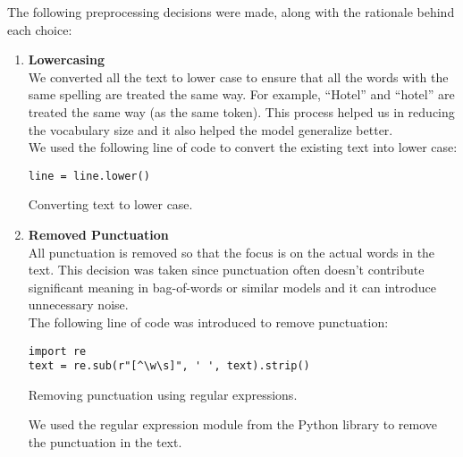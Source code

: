 \documentclass[a4paper]{article}
\begin{document}
The following preprocessing decisions were made, along with the rationale behind each choice:

\begin{enumerate}
    \item \textbf{Lowercasing} \\
    We converted all the text to lower case to ensure that all the words with the same spelling are treated the same way. 
    For example, ``Hotel'' and ``hotel'' are treated the same way (as the same token). 
    This process helped us in reducing the vocabulary size and it also helped the model generalize better. \\

    We used the following line of code to convert the existing text into lower case:

    \begin{listing}[ht]
    \begin{verbatim}
line = line.lower()
    \end{verbatim}
    \caption{Converting text to lower case.}
    \label{lst:lower}
    \end{listing}

    \item \textbf{Removed Punctuation} \\
    All punctuation is removed so that the focus is on the actual words in the text. 
    This decision was taken since punctuation often doesn't contribute significant meaning in bag-of-words or similar models and it can introduce unnecessary noise. \\

    The following line of code was introduced to remove punctuation:

    \begin{listing}[ht]
    \begin{verbatim}
import re
text = re.sub(r"[^\w\s]", ' ', text).strip()
    \end{verbatim}
    \caption{Removing punctuation using regular expressions.}
    \label{lst:punct}
    \end{listing}

    We used the regular expression module from the Python library to remove the punctuation in the text. 


\end{enumerate}
\end{document}
